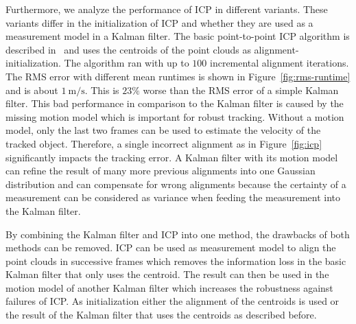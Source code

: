 \documentclass[twoside,a4paper,article]{combine}
\begin{document}
Furthermore, we analyze the performance of ICP in different
variants. These variants differ in the initialization of ICP and
whether they are used as a measurement model in a Kalman
filter. The basic point-to-point ICP algorithm is described
in~\cite{icp-basic} and uses the centroids of the point clouds as
alignment-initialization.
The algorithm ran with up to $100$ incremental
alignment iterations. The RMS error with different mean runtimes is
shown in Figure~\ref{fig:rms-runtime} and is about
$1\mathrm{~m/s}$. This is $23\%$ worse than the RMS error of a simple
Kalman filter. This bad
performance in comparison to the Kalman filter is caused by the
missing motion model which is important for robust tracking. Without a
motion model, only the last two frames can be used to estimate the
velocity of the tracked object. Therefore, a single incorrect
alignment as in Figure~\ref{fig:icp} significantly
impacts the tracking error. A Kalman filter with its motion model
can refine the result of many more previous alignments into one
Gaussian distribution and can compensate for wrong alignments because the
certainty of a measurement can be considered as variance when feeding
the measurement into the Kalman filter. 

By combining the Kalman filter and ICP into one method, the drawbacks
of both methods can be removed. ICP can be used as measurement model
to align the point clouds in successive frames which removes the
information loss in the basic Kalman filter that only uses the
centroid. The result can then be used in the motion model of another
Kalman filter which increases the robustness against failures of
ICP. As initialization either the alignment of the centroids is used
or the result of the Kalman filter that uses the centroids as
described before.
\end{document}

